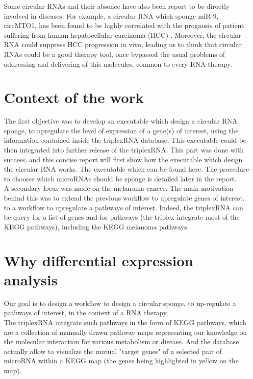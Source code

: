 \documentclass[a4paper,12pt]{report}
\begin{document}
Some circular RNAs and their absence have also been report to be directly involved in diseases. For example, a circular RNA which sponge miR-9, circMTO1, has been found to be highly  correlated with the prognosis of patient suffering from human hepatocellular carcinoma (HCC) \cite{carcinoma}. Moreover, the circular RNA could suppress HCC progression in vivo\cite{carcinoma}, leading us to think that circular RNAs could be a good therapy tool, once bypassed the usual problems of addressing and delivering of this molecules, common to every RNA therapy\cite{therapeutics}.


\section{Context of the work}

The first objective was to develop an executable which design a circular RNA sponge, to upregulate the level of expression of a gene(s) of interest, using the information contained inside the triplexRNA database. This executable could be then integrated into further release of the triplexRNA. This part was done with success, and this concise report will first show how the executable which design the circular RNA works. The executable which can be found here. The procedure to chooses which microRNAs should be sponge is detailed later in the report.\\

A secondary focus was made on the melanoma cancer.
The main motivation behind this was to extend the previous workflow to upregulate genes of interest, to a workflow to upregulate a pathways of interest.
 Indeed, the triplexRNA can be query for a list of genes and for pathways (the triplex integrate most of the KEGG pathways), including the KEGG melanoma pathways.\\

\section{Why differential expression analysis}

Our goal is to design a workflow to design a circular sponge, to up-regulate a pathways of interest, in the context of a RNA therapy.\\

The triplexRNA integrate such pathways in the form of KEGG pathways, which are a collection of manually drawn pathway maps representing our knowledge on the molecular interaction for various metabolism or disease\cite{KEGG}. And the database actually allow to visualize the mutual "target genes" of a selected pair of microRNA within a KEGG map (the genes being highlighted in yellow on the map).\\
\end{document}
